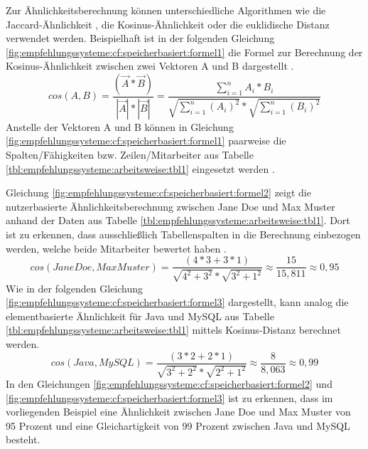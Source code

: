Zur Ähnlichkeitsberechnung können unterschiedliche Algorithmen wie die Jaccard-Ähnlichkeit \cite[S. 2]{bharti:2019}, die Kosinus-Ähnlichkeit \cite[S. 3]{bharti:2019}\cite[S. 2]{duong:2018} oder die euklidische Distanz \cite[S. 3]{cheng:2013} verwendet werden. Beispielhaft ist in der folgenden Gleichung \ref{fig:empfehlungssysteme:cf:speicherbasiert:formel1} die Formel zur Berechnung der Kosinus-Ähnlichkeit zwischen zwei Vektoren A und B dargestellt \cite[S. 151]{recommenderSystems:2016}\cite[S. 3]{bharti:2019}.
\begin{equation}
cos(A,B) = \frac{(\vec{A} * \vec{B})}{|\vec{A}| * |\vec{B}|} = \frac{\sum_{i=1}^n A_i * B_i}{\sqrt{\sum_{i=1}^n (A_i)^2} * \sqrt{\sum_{i=1}^n (B_i)^2}}
\label{fig:empfehlungssysteme:cf:speicherbasiert:formel1}
\end{equation}
Anstelle der Vektoren A und B können in Gleichung \ref{fig:empfehlungssysteme:cf:speicherbasiert:formel1} paarweise die Spalten/Fähigkeiten bzw. Zeilen/Mitarbeiter aus Tabelle \ref{tbl:empfehlungssysteme:arbeitsweise:tbl1} eingesetzt werden \cite[S. 36ff.]{recommenderSystems:2016}.

Gleichung \ref{fig:empfehlungssysteme:cf:speicherbasiert:formel2} zeigt die nutzerbasierte Ähnlichkeitsberechnung zwischen Jane Doe und Max Muster anhand der Daten aus Tabelle \ref{tbl:empfehlungssysteme:arbeitsweise:tbl1}. Dort ist zu erkennen, dass ausschließlich Tabellenspalten in die Berechnung einbezogen werden, welche beide Mitarbeiter bewertet haben \cite[S. 2f.]{hao:2013}.
\begin{equation}
	cos(Jane Doe,Max Muster) = \frac{(4*3 + 3*1)}{\sqrt{4^2 + 3^2} * \sqrt{3^2 + 1^2}} \approx \frac{15}{15,811} \approx 0,95
	\label{fig:empfehlungssysteme:cf:speicherbasiert:formel2}
\end{equation}
Wie in der folgenden Gleichung \ref{fig:empfehlungssysteme:cf:speicherbasiert:formel3} dargestellt, kann analog die elementbasierte Ähnlichkeit für Java und MySQL aus Tabelle \ref{tbl:empfehlungssysteme:arbeitsweise:tbl1} mittels Kosinus-Distanz berechnet werden.
\begin{equation}
	cos(Java, MySQL) = \frac{(3*2 + 2*1)}{\sqrt{3^2 + 2^2} * \sqrt{2^2 + 1^2}} \approx \frac{8}{8,063} \approx 0,99
	\label{fig:empfehlungssysteme:cf:speicherbasiert:formel3}
\end{equation}
In den Gleichungen \ref{fig:empfehlungssysteme:cf:speicherbasiert:formel2} und \ref{fig:empfehlungssysteme:cf:speicherbasiert:formel3} ist zu erkennen, dass im vorliegenden Beispiel eine Ähnlichkeit zwischen Jane Doe und Max Muster von 95 Prozent und eine Gleichartigkeit von 99 Prozent zwischen Java und MySQL besteht.%


